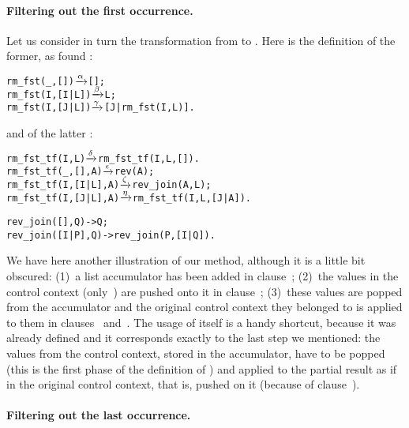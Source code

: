 \medskip

\paragraph{Filtering out the first occurrence.}

Let us consider in turn the transformation from  to
. Here is the definition of the former, as
found :
\begin{alltt}
rm_fst(_,   []) \(\smashedrightarrow{\alpha}\) [];
rm_fst(I,[I|L]) \(\smashedrightarrow{\beta}\) L;
rm_fst(I,[J|L]) \(\smashedrightarrow{\gamma}\) [J|rm_fst(I,L)].
\end{alltt}
and of the latter :
\begin{alltt}
rm_fst_tf(I,L)       \(\smashedrightarrow{\delta}\) rm_fst_tf(I,L,[]).
rm_fst_tf(_,   [],A) \(\smashedrightarrow{\epsilon}\) rev(A);
rm_fst_tf(I,[I|L],A) \(\smashedrightarrow{\zeta}\) rev_join(A,L);
rm_fst_tf(I,[J|L],A) \(\smashedrightarrow{\eta}\) rm_fst_tf(I,L,[J|A]).

rev_join(   [],Q) -> Q;
rev_join([I|P],Q) -> rev_join(P,[I|Q]).
\end{alltt}
We have here another illustration of our method, although it is a
little bit obscured: (1)~a list accumulator has been added in
clause~\clause{\delta}; (2)~the values in the control context
(only~) are pushed onto it in clause~\clause{\eta};
(3)~these values are popped from the accumulator and the original
control context they belonged to is applied to them in clauses
\clause{\epsilon}~and~\clause{\zeta}. The usage
of  itself is a handy shortcut, because it was
already defined and it corresponds exactly to the last step we
mentioned: the values from the control context, stored in the
accumulator, have to be popped (this is the first phase of the
definition of ) and applied to the partial result
as if in the original control context, that is, pushed on it (because
of clause~\clause{\beta}).

\medskip

\paragraph{Filtering out the last occurrence.}

